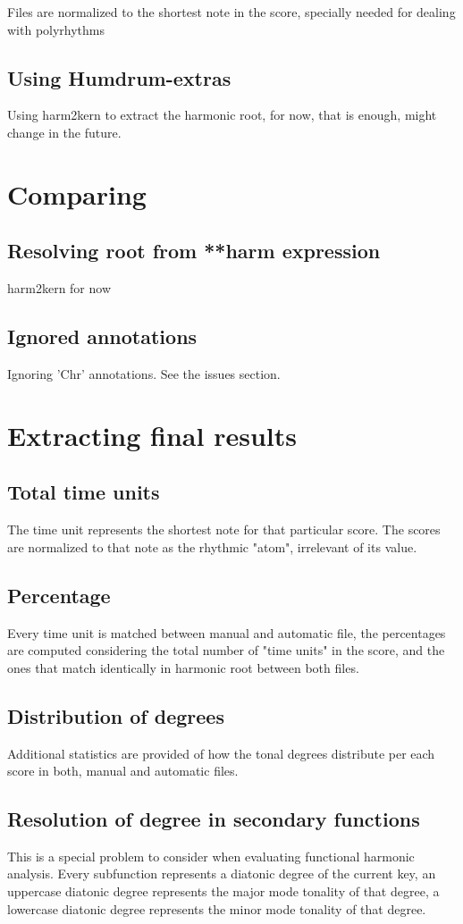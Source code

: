 	Files are normalized to the shortest note in the score, specially needed for dealing with polyrhythms


	\subsection{Using Humdrum-extras}
  Using harm2kern to extract the harmonic root, for now, that is enough, might change in the future.
\section{Comparing}
	\subsection{Resolving root from **harm expression}
  harm2kern for now
	\subsection{Ignored annotations}
  Ignoring 'Chr' annotations. See the issues section.
\section{Extracting final results}
	\subsection{Total time units}
  The time unit represents the shortest note for that particular score. The scores are normalized to that note as the rhythmic "atom", irrelevant of its value.
	\subsection{Percentage}
  Every time unit is matched between manual and automatic file, the percentages are computed considering the total number of "time units" in the score, and the ones that match identically in harmonic root between both files.
	\subsection{Distribution of degrees}
  Additional statistics are provided of how the tonal degrees distribute per each score in both, manual and automatic files.
	\subsection{Resolution of degree in secondary functions}
  This is a special problem to consider when evaluating functional harmonic analysis. Every subfunction represents a diatonic degree of the current key, an uppercase diatonic degree represents the major mode tonality of that degree, a lowercase diatonic degree represents the minor mode tonality of that degree.

\newpage
